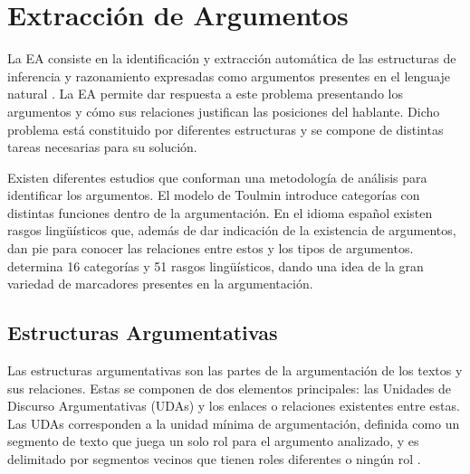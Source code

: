 \documentclass[a4paper,11pt,twocolumn,twoside]{article}
\begin{document}


\section{Extracción de Argumentos} %

La EA consiste en la identificación y extracción 
automática de las estructuras de inferencia y 
razonamiento expresadas como argumentos presentes en el lenguaje natural \cite{lawrence2020argument}.
La EA permite dar respuesta a este problema presentando
los argumentos y cómo sus relaciones justifican las posiciones del hablante. Dicho problema está constituido por diferentes 
estructuras y se compone de distintas tareas necesarias para su solución.

Existen diferentes estudios que conforman una metodología de análisis para
identificar los argumentos. El modelo de Toulmin \cite{toulmin_2003} introduce categorías 
con distintas funciones dentro de la argumentación. En 
el idioma español existen rasgos lingüísticos que, además de dar indicación de la existencia de argumentos, 
dan pie para conocer las relaciones entre estos y los tipos de argumentos. 
determina 16 categorías y 51 rasgos lingüísticos, dando una idea de la gran variedad de marcadores 
presentes en la argumentación.

\subsection{Estructuras Argumentativas}

Las estructuras argumentativas son las partes de la argumentación de los textos y sus relaciones.
Estas se componen de dos elementos principales: las Unidades de Discurso Argumentativas (UDAs) y los enlaces
o relaciones existentes entre estas. Las UDAs corresponden a la unidad mínima de argumentación, definida 
como un segmento de texto que juega un solo rol para el argumento analizado, y es 
delimitado por segmentos vecinos que tienen roles diferentes o ningún rol \cite{stede2018argumentation}.
\end{document}
